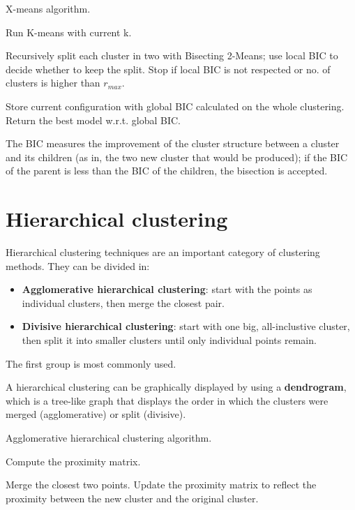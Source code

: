 \begin{algorithm}
\caption{X-means algorithm.}
\begin{algorithmic}[1]
        \State Run K-means with current k.
        
        \State Recursively split each cluster in two with Bisecting 2-Means; use local BIC to decide whether to keep the split. Stop if local BIC is not respected or no. of clusters is higher than $r_{max}$.

        \State Store current configuration with global BIC calculated on the whole clustering.
    \EndFor
    \State Return the best model w.r.t. global BIC.
\end{algorithmic}
\end{algorithm}

The BIC measures the improvement of the cluster structure between a cluster and its children (as in, the two new cluster that would be produced); if the BIC of the parent is less than the BIC of the children, the bisection is accepted.

\section{Hierarchical clustering}

Hierarchical clustering techniques are an important category of clustering methods. They can be divided in:

\begin{itemize}
    \item \textbf{Agglomerative hierarchical clustering}: start with the points as individual clusters, then merge the closest pair.

    \item \textbf{Divisive hierarchical clustering}: start with one big, all-inclustive cluster, then split it into smaller clusters until only individual points remain.
\end{itemize}

The first group is most commonly used.

A hierarchical clustering can be graphically displayed by using a \textbf{dendrogram}, which is a tree-like graph that displays the order in which the clusters were merged (agglomerative) or split (divisive).

\begin{algorithm}
\caption{Agglomerative hierarchical clustering algorithm.}
\begin{algorithmic}[1]
    \State Compute the proximity matrix.

    \Repeat
        \State Merge the closest two points.
        \State Update the proximity matrix to reflect the proximity between the new cluster and the original cluster.
\end{algorithmic}
\end{algorithm}

